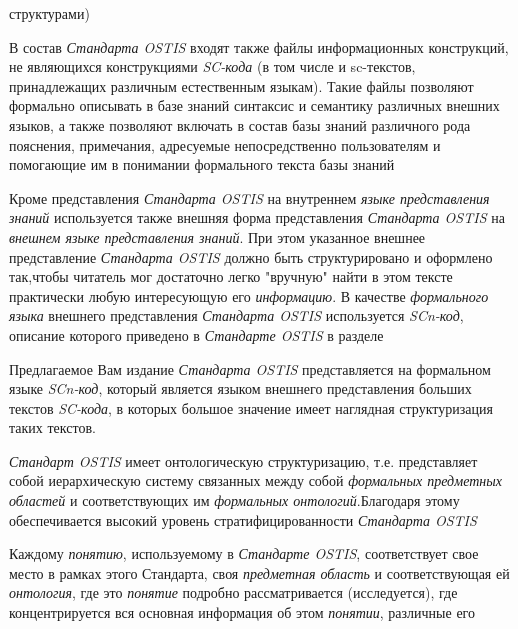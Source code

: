 \begin{SCn}
{\begin{scnvector}
{			            структурами)}
			\item{В состав \textit{Стандарта OSTIS} входят также файлы
			            информационных конструкций, не являющихся конструкциями \textit{SC-кода} (в том
			            числе и sc-текстов, принадлежащих различным естественным языкам). Такие файлы
			            позволяют формально описывать в базе знаний синтаксис и семантику различных
			            внешних языков, а также позволяют включать в состав базы знаний различного рода
			            пояснения, примечания, адресуемые непосредственно пользователям и помогающие им
			            в понимании формального текста базы знаний}
			\item{Кроме представления \textit{Стандарта OSTIS} на внутреннем
			\textit{языке представления знаний} используется также внешняя форма
			представления \textit{Стандарта OSTIS} на \textit{внешнем языке представления
				знаний}. При этом указанное внешнее представление \textit{Стандарта OSTIS}
			должно быть структурировано и оформлено так,чтобы читатель мог достаточно легко
			"вручную"{} найти в этом тексте практически любую интересующую его
			\textit{информацию}. В качестве \textit{формального языка} внешнего
			представления \textit{Стандарта OSTIS} используется \textit{SCn-код}, описание
			которого приведено в \textit{Стандарте OSTIS} в разделе }
			\item{Предлагаемое Вам издание \textit{Стандарта OSTIS}
			            представляется на формальном языке \textit{SCn-код}, который является языком
			            внешнего представления больших текстов \textit{SC-кода}, в которых большое
			            значение имеет наглядная структуризация таких текстов.}
			\item{\textit{Стандарт OSTIS} имеет онтологическую
			            структуризацию, т.е. представляет собой иерархическую систему связанных между
			            собой \textit{формальных предметных областей} и соответствующих им
			            \textit{формальных онтологий}.Благодаря этому обеспечивается высокий уровень
			            стратифицированности \textit{Стандарта OSTIS}}
			\item{Каждому \textit{понятию}, используемому в
			            \textit{Стандарте OSTIS}, соответствует свое место в рамках этого Стандарта,
			            своя \textit{предметная область} и соответствующая ей \textit{онтология}, где
			            это \textit{понятие} подробно рассматривается (исследуется), где
			            концентрируется вся основная информация об этом \textit{понятии}, различные его
}
\end{scnvector}}
\end{SCn}

